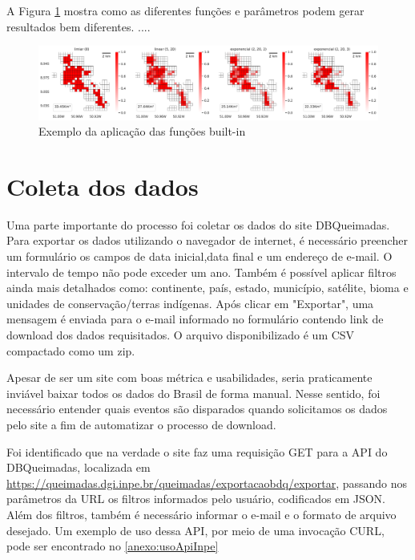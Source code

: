 \documentclass[cic,tc]{iiufrgs}
\begin{document}
A Figura \ref{fig:aplicacao_funcoes_built_in} mostra como as diferentes funções e parâmetros podem gerar resultados bem diferentes. .... \par

\begin{figure}[H]
    \caption{Exemplo da aplicação das funções built-in}
    \begin{center}
        \includegraphics[width=35em]{aplicacao_funcoes_built_in}
    \end{center}
    \label{fig:aplicacao_funcoes_built_in}
\end{figure}


\section{Coleta dos dados}

Uma parte importante do processo foi coletar os dados do site DBQueimadas. Para exportar os dados utilizando o navegador de internet, é necessário preencher um formulário os campos de data inicial,data final e um endereço de e-mail. O intervalo de tempo não pode exceder um ano. Também é possível aplicar filtros ainda mais detalhados como: continente, país, estado, município, satélite, bioma e unidades de conservação/terras indígenas. Após clicar em "Exportar", uma mensagem é enviada para o e-mail informado no formulário contendo link de download dos dados requisitados. O arquivo disponibilizado é um CSV compactado como um zip. \par

Apesar de ser um site com boas métrica e usabilidades, seria praticamente inviável baixar todos os dados do Brasil de forma manual. Nesse sentido, foi necessário entender quais eventos são disparados quando solicitamos os dados pelo site a fim de automatizar o processo de download. \par

Foi identificado que na verdade o site faz uma requisição GET para a API do DBQueimadas, localizada em \url{https://queimadas.dgi.inpe.br/queimadas/exportacaobdq/exportar}, passando nos parâmetros da URL os filtros informados pelo usuário, codificados em JSON. Além dos filtros, também é necessário informar o e-mail e o formato de arquivo desejado. Um exemplo de uso dessa API, por meio de uma invocação CURL, pode ser encontrado no \ref{anexo:usoApiInpe} \par
\end{document}
